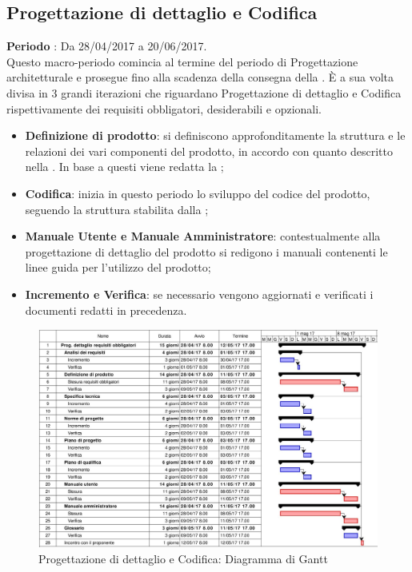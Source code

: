 \documentclass[../PianoDiProgetto.tex]{subfiles}
\begin{document}
		\subsection{Progettazione di dettaglio e Codifica}
		\textbf{Periodo} : Da 28/04/2017 a 20/06/2017. \\
		Questo macro-periodo comincia al termine del periodo di Progettazione architetturale e prosegue fino alla scadenza della consegna della \revisionediqualifica.
		È a sua volta divisa in 3 grandi iterazioni che riguardano Progettazione di dettaglio e Codifica rispettivamente dei requisiti obbligatori, desiderabili e opzionali.
		\begin{itemize}
			\item \textbf{Definizione di prodotto}: si definiscono approfonditamente la struttura e le relazioni dei vari componenti del prodotto, in accordo con quanto descritto nella \specificatecnica. In base a questi viene redatta la ;
			\item \textbf{Codifica}: inizia in questo periodo lo sviluppo del codice del prodotto, seguendo la struttura stabilita dalla ;
			\item \textbf{Manuale Utente e Manuale Amministratore}: contestualmente alla progettazione di dettaglio del prodotto si redigono i manuali contenenti le linee guida per l'utilizzo del prodotto; 
			\item \textbf{Incremento e Verifica}: se necessario vengono aggiornati e verificati i documenti redatti in precedenza.
		\end{itemize}
		\begin{figure}[H]
			\centering
			\includegraphics[scale=0.55]{Figures/Gantt_DettaglioObbligatori}
			\caption{Progettazione di dettaglio e Codifica: Diagramma di Gantt}
		\end{figure}
\end{document}
